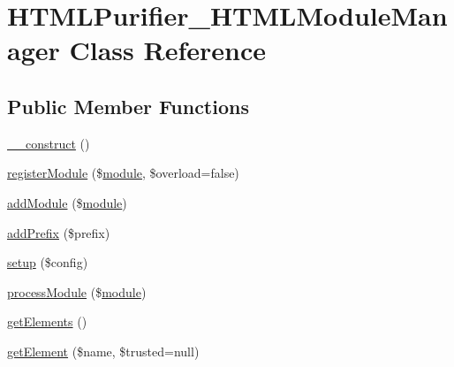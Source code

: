 \hypertarget{classHTMLPurifier__HTMLModuleManager}{\section{H\+T\+M\+L\+Purifier\+\_\+\+H\+T\+M\+L\+Module\+Manager Class Reference}
\label{classHTMLPurifier__HTMLModuleManager}
}
\subsection*{Public Member Functions}
\begin{DoxyCompactItemize}
\item 
\hyperlink{classHTMLPurifier__HTMLModuleManager_ab4cf47bc757a0945f1f863be6af70817}{\+\_\+\+\_\+construct} ()
\item 
\hyperlink{classHTMLPurifier__HTMLModuleManager_ac91cb089402a19c3257ddab318d5a315}{register\+Module} (\$\hyperlink{classmodule}{module}, \$overload=false)
\item 
\hyperlink{classHTMLPurifier__HTMLModuleManager_a4431aef113f408e637230870a06f1d6a}{add\+Module} (\$\hyperlink{classmodule}{module})
\item 
\hyperlink{classHTMLPurifier__HTMLModuleManager_ae71327a3f4d2ef1bdb245e0472943904}{add\+Prefix} (\$prefix)
\item 
\hyperlink{classHTMLPurifier__HTMLModuleManager_a231d31b028783d14a737518593a56ab8}{setup} (\$config)
\item 
\hyperlink{classHTMLPurifier__HTMLModuleManager_a8270448d8f0db95d3edd97e50c39567d}{process\+Module} (\$\hyperlink{classmodule}{module})
\item 
\hyperlink{classHTMLPurifier__HTMLModuleManager_a5b85d28bdcb0ec465475a078a6b0c982}{get\+Elements} ()
\item 
\hyperlink{classHTMLPurifier__HTMLModuleManager_a3d228475c622633648fc0d92174d26bd}{get\+Element} (\$name, \$trusted=null)
\end{DoxyCompactItemize}
